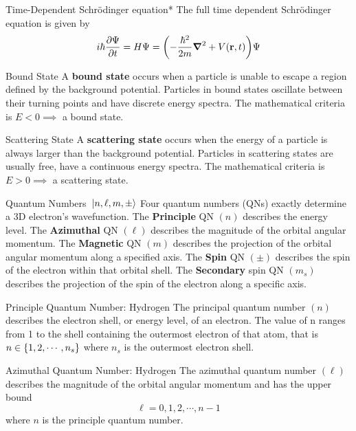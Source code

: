\documentclass[avery5371,grid]{flashcards}
\begin{document}
\begin{flashcard}[Definition]{Time-Dependent Schr\"odinger equation*}
	The full time dependent Schr\"odinger equation is given by 
	\begin{equation*}
		i\hbar\pdv{\Psi}{t} (\mathbf{r},t) = H\Psi = \qty(- \frac{\hbar^2}{2m}\grad^2 + V(\mathbf{r},t))\Psi 
	\end{equation*}
\end{flashcard}

\begin{flashcard}[Theory]{Bound State}
	A \textbf{bound state} occurs when a particle is unable to escape a region defined by the background potential. Particles in bound states oscillate between their turning points and have discrete energy spectra. The mathematical criteria is $E<0 \implies$ a bound state.
\end{flashcard}

\begin{flashcard}[Theory]{Scattering State}
	A \textbf{scattering state} occurs when the energy of a particle is always larger than the background potential. Particles in scattering states are usually free, have a continuous energy spectra. The mathematical criteria is $E>0 \implies$ a scattering state.
\end{flashcard}

\begin{flashcard}[Theory]{Quantum Numbers\ $\ket{n,\ell,m,\pm}$}
	Four quantum numbers (QNs) exactly determine a 3D electron's wavefunction. The \textbf{Principle} QN $(n)$ describes the energy level. The \textbf{Azimuthal} QN $(\ell)$ describes the magnitude of the orbital angular momentum. The \textbf{Magnetic} QN $(m)$ describes the projection of the orbital angular momentum along a specified axis. The \textbf{Spin} QN $(\pm)$ describes the spin of the electron within that orbital shell. The \textbf{Secondary} spin QN $(m_s)$ describes the projection of the spin of the electron along a specific axis.
\end{flashcard}

\begin{flashcard}[Theory]{Principle Quantum Number: Hydrogen}
	The principal quantum number $(n)$ describes the electron shell, or energy level, of an electron. The value of n ranges from 1 to the shell containing the outermost electron of that atom, that is $n\in\qty{1,2,\cdots,n_s}$ where $n_s$ is the outermost electron shell. 
\end{flashcard}

\begin{flashcard}[Theory]{Azimuthal Quantum Number: Hydrogen}
	The azimuthal quantum number $(\ell)$ describes the magnitude of the orbital angular momentum and has the upper bound
	\begin{equation*}
		\ell = 0, 1, 2,\cdots, n-1
	\end{equation*}
	where $n$ is the principle quantum number.
\end{flashcard}
\end{document}
